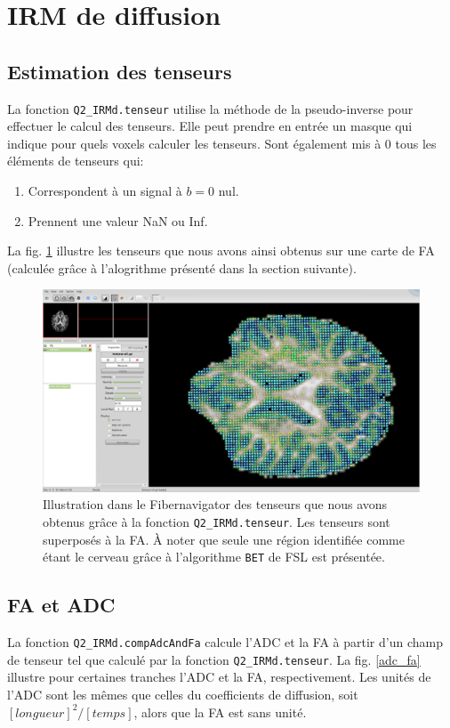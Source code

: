 \documentclass[a4paper]{article}
\begin{document}
\section{IRM de diffusion}

\subsection{Estimation des tenseurs}
La fonction \lstinline{Q2_IRMd.tenseur} utilise la méthode de la pseudo-inverse pour effectuer le calcul des tenseurs. Elle peut prendre en entrée un masque qui indique pour quels voxels calculer les tenseurs. Sont également mis à 0 tous les éléments de tenseurs qui:
\begin{enumerate}
\item Correspondent à un signal à $b=0$ nul.
\item Prennent une valeur NaN ou Inf. 
\end{enumerate}
La fig. \ref{tenseurs_fiber} illustre les tenseurs que nous avons ainsi obtenus sur une carte de FA (calculée grâce à l'alogrithme présenté dans la section suivante).
\begin{figure}
\begin{center}
\includegraphics[scale=0.22]{tenseurs_fiber}
\caption{Illustration dans le Fibernavigator des tenseurs que nous avons obtenus grâce à la fonction \lstinline{Q2_IRMd.tenseur}. Les tenseurs sont superposés à la FA. À noter que seule une région identifiée comme étant le cerveau grâce à l'algorithme \lstinline{BET} de FSL est présentée. \label{tenseurs_fiber}}
\end{center}
\end{figure}

\subsection{FA et ADC}
La fonction \lstinline{Q2_IRMd.compAdcAndFa} calcule l'ADC et la FA à partir d'un champ de tenseur tel que calculé par la fonction \lstinline{Q2_IRMd.tenseur}. La fig. \ref{adc_fa} illustre pour certaines tranches l'ADC et la FA, respectivement. Les unités de l'ADC sont les mêmes que celles du coefficients de diffusion, soit $[longueur]^2/[temps]$, alors que la FA est sans unité.
\end{document}
